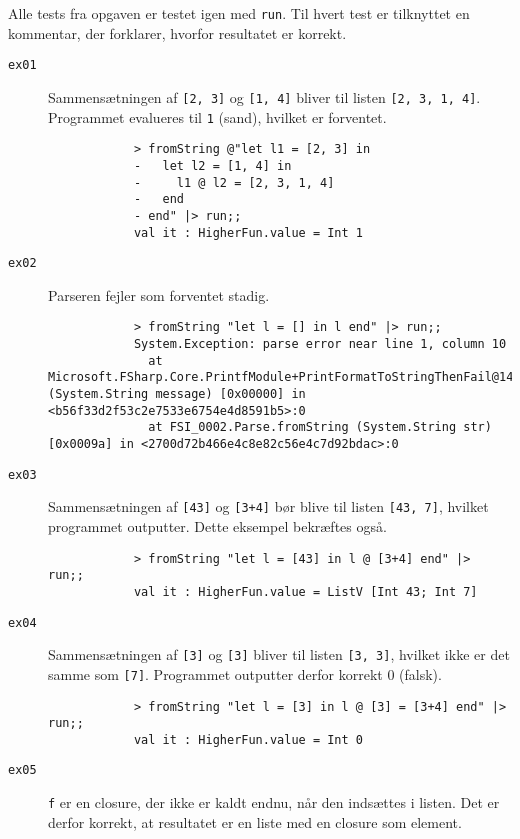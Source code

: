 Alle tests fra opgaven er testet igen med \texttt{run}. Til hvert test er tilknyttet en kommentar, der forklarer, hvorfor resultatet er korrekt.

\begin{description}
    \item[\texttt{ex01}] Sammensætningen af \texttt{[2, 3]} og \texttt{[1, 4]} bliver til listen \texttt{[2, 3, 1, 4]}. Programmet evalueres til \texttt{1} (sand), hvilket er forventet.
        \begin{verbatim}
            > fromString @"let l1 = [2, 3] in
            -   let l2 = [1, 4] in
            -     l1 @ l2 = [2, 3, 1, 4]
            -   end
            - end" |> run;;
            val it : HigherFun.value = Int 1
        \end{verbatim}
    \item[\texttt{ex02}] Parseren fejler som forventet stadig.
        \begin{verbatim}
            > fromString "let l = [] in l end" |> run;;
            System.Exception: parse error near line 1, column 10
              at Microsoft.FSharp.Core.PrintfModule+PrintFormatToStringThenFail@1433[TResult].Invoke (System.String message) [0x00000] in <b56f33d2f53c2e7533e6754e4d8591b5>:0
              at FSI_0002.Parse.fromString (System.String str) [0x0009a] in <2700d72b466e4c8e82c56e4c7d92bdac>:0
        \end{verbatim}
    \item[\texttt{ex03}] Sammensætningen af \texttt{[43]} og \texttt{[3+4]} bør blive til listen \texttt{[43, 7]}, hvilket programmet outputter. Dette eksempel bekræftes også.
        \begin{verbatim}
            > fromString "let l = [43] in l @ [3+4] end" |> run;;
            val it : HigherFun.value = ListV [Int 43; Int 7]
        \end{verbatim}
    \item[\texttt{ex04}] Sammensætningen af \texttt{[3]} og \texttt{[3]} bliver til listen \texttt{[3, 3]}, hvilket ikke er det samme som \texttt{[7]}. Programmet outputter derfor korrekt 0 (falsk).
        \begin{verbatim}
            > fromString "let l = [3] in l @ [3] = [3+4] end" |> run;;
            val it : HigherFun.value = Int 0
        \end{verbatim}
    \item[\texttt{ex05}] \texttt{f} er en closure, der ikke er kaldt endnu, når den indsættes i listen. Det er derfor korrekt, at resultatet er en liste med en closure som element.

\end{description}
